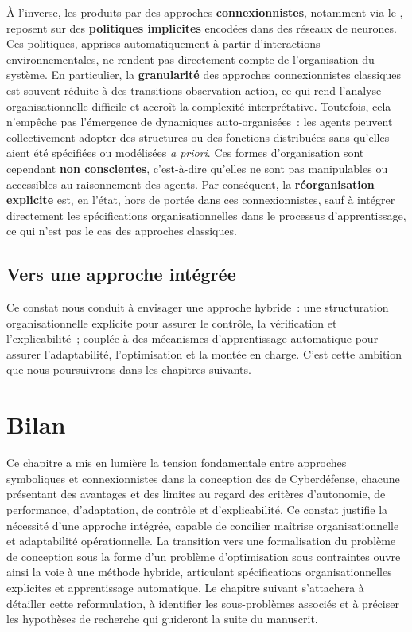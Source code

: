 À l'inverse, les  produits par des approches \textbf{connexionnistes}, notamment via le , reposent sur des \textbf{politiques implicites} encodées dans des réseaux de neurones. Ces politiques, apprises automatiquement à partir d'interactions environnementales, ne rendent pas directement compte de l'organisation du système. En particulier, la \textbf{granularité} des approches connexionnistes classiques est souvent réduite à des transitions observation-action, ce qui rend l'analyse organisationnelle difficile et accroît la complexité interprétative. Toutefois, cela n'empêche pas l'émergence de dynamiques auto-organisées~: les agents peuvent collectivement adopter des structures ou des fonctions distribuées sans qu'elles aient été spécifiées ou modélisées \textit{a priori}. Ces formes d'organisation sont cependant \textbf{non conscientes}, c'est-à-dire qu'elles ne sont pas manipulables ou accessibles au raisonnement des agents. Par conséquent, la \textbf{réorganisation explicite} est, en l'état, hors de portée dans ces  connexionnistes, sauf à intégrer directement les spécifications organisationnelles dans le processus d'apprentissage, ce qui n'est pas le cas des approches  classiques.

\subsection*{Vers une approche intégrée}

Ce constat nous conduit à envisager une approche hybride~: une structuration organisationnelle explicite pour assurer le contrôle, la vérification et l'explicabilité~; couplée à des mécanismes d'apprentissage automatique pour assurer l'adaptabilité, l'optimisation et la montée en charge. C'est cette ambition que nous poursuivrons dans les chapitres suivants.

\section{Bilan}
Ce chapitre a mis en lumière la tension fondamentale entre approches symboliques et connexionnistes dans la conception des  de Cyberdéfense, chacune présentant des avantages et des limites au regard des critères d'autonomie, de performance, d'adaptation, de contrôle et d'explicabilité. Ce constat justifie la nécessité d'une approche intégrée, capable de concilier maîtrise organisationnelle et adaptabilité opérationnelle. La transition vers une formalisation du problème de conception sous la forme d'un problème d'optimisation sous contraintes ouvre ainsi la voie à une méthode hybride, articulant spécifications organisationnelles explicites et apprentissage automatique. Le chapitre suivant s'attachera à détailler cette reformulation, à identifier les sous-problèmes associés et à préciser les hypothèses de recherche qui guideront la suite du manuscrit.


